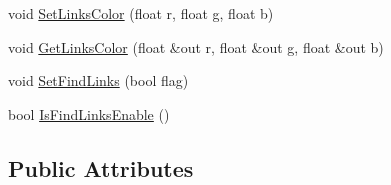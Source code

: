 \begin{DoxyCompactItemize}
\item 
void \hyperlink{class_n_g_u_i_label_rich_ae585684d6041e843d947969a193f0dbe}{Set\+Links\+Color} (float r, float g, float b)
\item 
void \hyperlink{class_n_g_u_i_label_rich_a5a1b818293ba4c491a64f3be6eb2a058}{Get\+Links\+Color} (float \&out r, float \&out g, float \&out b)
\item 
void \hyperlink{class_n_g_u_i_label_rich_a4e90829a193b725164089554447eec05}{Set\+Find\+Links} (bool flag)
\item 
bool \hyperlink{class_n_g_u_i_label_rich_ae3e5f9444f040557ed8fea8bc78e4257}{Is\+Find\+Links\+Enable} ()
\end{DoxyCompactItemize}
\subsection*{Public Attributes}
